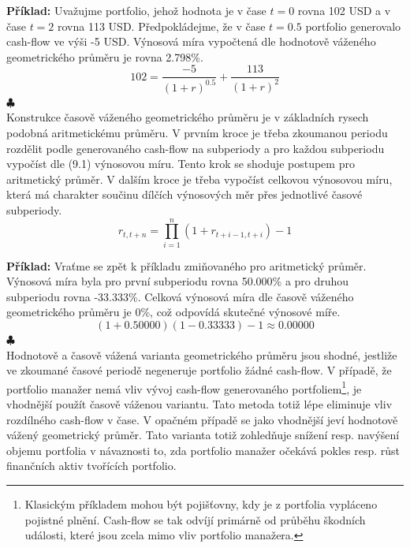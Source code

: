 \documentclass[a4paper]{book}
\begin{document}
\noindent \textbf{Příklad:} Uvažujme portfolio, jehož hodnota je v čase $t = 0$ rovna 102 USD a v čase $t=2$ rovna 113 USD. Předpokládejme, že v čase $t = 0.5$ portfolio generovalo cash-flow ve výši -5 USD. Výnosová míra vypočtená dle hodnotově váženého geometrického průměru je rovna 2.798\%.
\begin{equation*}
102 = \frac{-5}{(1+r)^{0.5}} + \frac{113}{(1+r)^2}
\end{equation*} 
$\clubsuit$\\

Konstrukce časově váženého geometrického průměru je v základních rysech podobná aritmetickému průměru. V prvním kroce je třeba zkoumanou periodu rozdělit podle generovaného cash-flow na subperiody a pro každou subperiodu vypočíst dle (9.1) výnosovou míru. Tento krok se shoduje postupem pro aritmetický průměr. V dalším kroce je třeba vypočíst celkovou výnosovou míru, která má charakter součinu dílčích výnosových měr přes jednotlivé časové subperiody.
\begin{equation*}
r_{t, t + n} = \prod_{i=1}^n (1 + r_{t + i - 1, t + i}) - 1
\end{equation*}

\noindent \textbf{Příklad:} Vraťme se zpět k příkladu zmiňovaného pro aritmetický průměr. Výnosová míra byla pro první subperiodu rovna 50.000\% a pro druhou subperiodu rovna -33.333\%. Celková výnosová míra dle časově váženého geometrického průměru je 0\%, což odpovídá skutečné výnosové míře.
\begin{equation*}
(1 + 0.50000)(1 - 0.33333) - 1 \approx 0.00000
\end{equation*}
$\clubsuit$\\

Hodnotově a časově vážená varianta geometrického průměru jsou shodné, jestliže ve zkoumané časové periodě negeneruje portfolio žádné cash-flow. V případě, že portfolio manažer nemá vliv vývoj cash-flow generovaného portfoliem\footnote{Klasickým příkladem mohou být pojišťovny, kdy je z portfolia vypláceno pojistné plnění. Cash-flow se tak odvíjí primárně od průběhu škodních události, které jsou zcela mimo vliv portfolio manažera.}, je vhodnější použít časově váženou variantu. Tato metoda totiž lépe eliminuje vliv rozdílného cash-flow v čase. V opačném případě se jako vhodnější jeví hodnotově vážený geometrický průměr. Tato varianta totiž zohledňuje snížení resp. navýšení objemu portfolia v návaznosti to, zda portfolio manažer očekává pokles resp. růst finančních aktiv tvořících portfolio.
\end{document}
